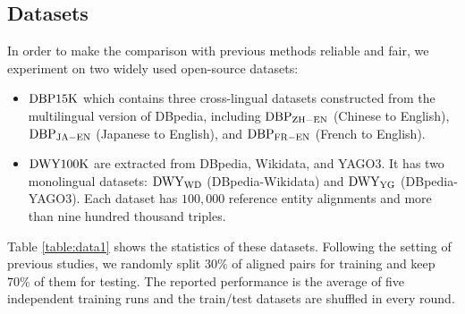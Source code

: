 \documentclass[sigconf,camera-ready]{acmart}
\begin{document}
\begin{table}[t]
\begin{center}
\end{center}
\caption{Statistical data of DBP15K and DWY100K.}\label{table:data1}
\end{table}

\subsection{Datasets}
In order to make the comparison with previous methods reliable and fair, we experiment on two widely used open-source datasets:
\begin{itemize}
  \item $\rm{DBP15K}$ \cite{DBLP:conf/semweb/SunHL17} which contains three cross-lingual datasets constructed from the multilingual version of DBpedia, including $\rm{DBP_{ZH-EN}}$ (Chinese to English), $\rm{DBP_{JA-EN}}$ (Japanese to English), and $\rm{DBP_{FR-EN}}$ (French to English).
  \item $\rm{DWY100K}$ \cite{DBLP:conf/ijcai/SunHZQ18} are extracted from DBpedia, Wikidata, and YAGO$3$. It has two monolingual datasets: $\rm{DWY_{WD}}$ (DBpedia-Wikidata) and $\rm{DWY_{YG}}$ (DBpedia-YAGO$3$). Each dataset has $100,000$ reference entity alignments and more than nine hundred thousand triples.
\end{itemize}
Table \ref{table:data1} shows the statistics of these datasets.
Following the setting of previous studies, we randomly split $30\%$ of aligned pairs for training and keep $70\%$ of them for testing.
The reported performance is the average of five independent training runs and the train/test datasets are shuffled in every round.
\end{document}
